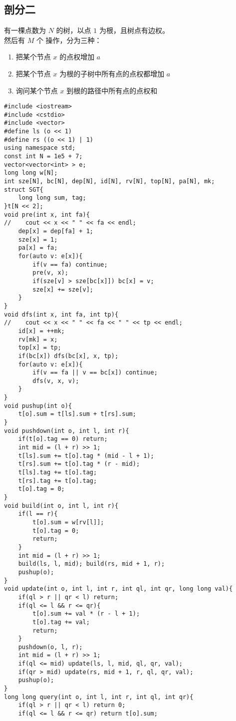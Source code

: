 \subsection{剖分二}
有一棵点数为 $N$ 的树，以点 $1$ 为根，且树点有边权。\\
然后有 $M$ 个 操作，分为三种： 
\begin{enumerate}[操作1.]
    \item 把某个节点 $x$ 的点权增加 $a$
    \item 把某个节点 $x$ 为根的子树中所有点的点权都增加 $a$ 
    \item 询问某个节点 $x$ 到根的路径中所有点的点权和
\end{enumerate}
\begin{lstlisting}
#include <iostream>
#include <cstdio>
#include <vector>
#define ls (o << 1)
#define rs ((o << 1) | 1)
using namespace std;
const int N = 1e5 + 7;
vector<vector<int> > e;
long long w[N];
int sze[N], bc[N], dep[N], id[N], rv[N], top[N], pa[N], mk;
struct SGT{
    long long sum, tag;
}t[N << 2];
void pre(int x, int fa){
//    cout << x << " " << fa << endl;
    dep[x] = dep[fa] + 1;
    sze[x] = 1;
    pa[x] = fa;
    for(auto v: e[x]){
        if(v == fa) continue;
        pre(v, x);
        if(sze[v] > sze[bc[x]]) bc[x] = v;
        sze[x] += sze[v];
    }
}
void dfs(int x, int fa, int tp){
//    cout << x << " " << fa << " " << tp << endl;
    id[x] = ++mk;
    rv[mk] = x;
    top[x] = tp;
    if(bc[x]) dfs(bc[x], x, tp);
    for(auto v: e[x]){
        if(v == fa || v == bc[x]) continue;
        dfs(v, x, v);
    }
}
void pushup(int o){
    t[o].sum = t[ls].sum + t[rs].sum;
}
void pushdown(int o, int l, int r){
    if(t[o].tag == 0) return;
    int mid = (l + r) >> 1;
    t[ls].sum += t[o].tag * (mid - l + 1);
    t[rs].sum += t[o].tag * (r - mid);
    t[ls].tag += t[o].tag;
    t[rs].tag += t[o].tag;
    t[o].tag = 0;
}
void build(int o, int l, int r){
    if(l == r){
        t[o].sum = w[rv[l]];
        t[o].tag = 0;
        return;
    }
    int mid = (l + r) >> 1;
    build(ls, l, mid); build(rs, mid + 1, r);
    pushup(o);
}
void update(int o, int l, int r, int ql, int qr, long long val){
    if(ql > r || qr < l) return;
    if(ql <= l && r <= qr){
        t[o].sum += val * (r - l + 1);
        t[o].tag += val;
        return;
    }
    pushdown(o, l, r);
    int mid = (l + r) >> 1;
    if(ql <= mid) update(ls, l, mid, ql, qr, val);
    if(qr > mid) update(rs, mid + 1, r, ql, qr, val);
    pushup(o);
}
long long query(int o, int l, int r, int ql, int qr){
    if(ql > r || qr < l) return 0;
    if(ql <= l && r <= qr) return t[o].sum;

\end{lstlisting}
